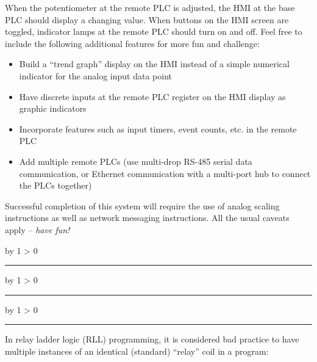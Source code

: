 \documentclass[12pt,a4paper]{article}
\def\oppgave{
            \advance\questnum by 1
            \ifnum \questnum > 0
                 \hrule
                 \vskip 3pt
                 \leftline{Oppgave \the\questnum}
                 \vskip 3pt \fi}
\def\svar{
           \advance\answnum by 1
           \ifnum \answnum > 0
                \hrule
                \vskip 3pt
                \leftline{Svar \the\answnum}
                \vskip 3pt \fi}
\def\notes{
           \advance\explnum by 1
           \ifnum \explnum > 0
                \hrule
                \vskip 3pt
                \leftline{Notes \the\explnum}
                \vskip 3pt \fi}
\begin{document}
When the potentiometer at the remote PLC is adjusted, the HMI at the base PLC should display a changing value.  When buttons on the HMI screen are toggled, indicator lamps at the remote PLC should turn on and off.  Feel free to include the following additional features for more fun and challenge:

\begin{itemize}
\item{} Build a ``trend graph'' display on the HMI instead of a simple numerical indicator for the analog input data point
\vskip 5pt
\item{} Have discrete inputs at the remote PLC register on the HMI display as graphic indicators
\vskip 5pt
\item{} Incorporate features such as input timers, event counts, etc. in the remote PLC
\vskip 5pt
\item{} Add multiple remote PLCs (use multi-drop RS-485 serial data communication, or Ethernet communication with a multi-port hub to connect the PLCs together)
\end{itemize}

\vskip 10pt

Successful completion of this system will require the use of analog scaling instructions as well as network messaging instructions.  All the usual caveats apply -- {\it have fun!}

\vfil 

\eject
\vskip 10pt \filbreak 





\svar{} 

 
\vskip 10pt \filbreak 





\notes{} 



\vfil \eject 



\oppgave{} 

In relay ladder logic (RLL) programming, it is considered bad practice to have multiple instances of an identical (standard) ``relay'' coil in a program:
\end{document}
